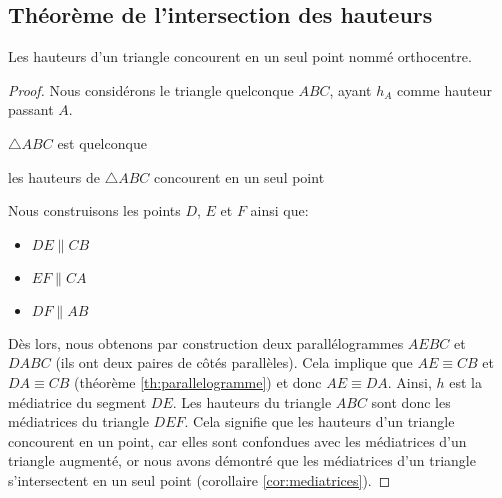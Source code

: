 \documentclass[a4paper,12pt]{article}
\begin{document}
\pagebreak
\subsection{Théorème de l'intersection des hauteurs}
\begin{theorem}
Les hauteurs d'un triangle concourent en un seul point nommé orthocentre.
\end{theorem}

\begin{proof}
Nous considérons le triangle quelconque $ABC$, ayant $h_A$ comme hauteur passant $A$.
\begin{hyp}
$\triangle ABC$ est quelconque
\end{hyp}
\begin{concl}
les hauteurs de $\triangle ABC$ concourent en un seul point
\end{concl}
Nous construisons les points $D$, $E$ et $F$ ainsi que:
\begin{itemize}
    \item $DE \parallel CB$
    \item $EF \parallel CA$
    \item $DF \parallel AB$
\end{itemize}
Dès lors, nous obtenons par construction deux parallélogrammes $AEBC$ et $DABC$ (ils ont deux paires de côtés parallèles). Cela implique que $AE \equiv CB$ et $DA \equiv CB$ (théorème \ref{th:parallelogramme}) et donc $AE \equiv DA$. Ainsi, $h$ est la médiatrice du segment $DE$. Les hauteurs du triangle $ABC$ sont donc les médiatrices du triangle $DEF$. Cela signifie que les hauteurs d'un triangle concourent en un point, car elles sont confondues avec les médiatrices d'un triangle augmenté, or nous avons démontré que les médiatrices d'un triangle s'intersectent en un seul point (corollaire \ref{cor:mediatrices}).
\end{proof}
\end{document}
